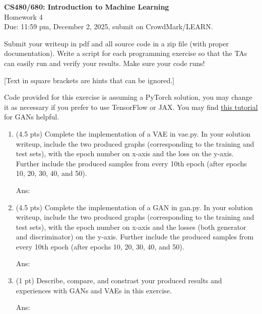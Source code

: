 \documentclass[10pt,letter,notitlepage]{article}
\newcommand{\ans}[1]{{\color{orange}\textsf{Ans}: #1}}
\newcounter{exercise}
\begin{document}
\begin{center}
\large{\textbf{CS480/680: Introduction to Machine Learning} \\ Homework 4\\ Due: 11:59 pm, December 2, 2025, submit on CrowdMark/LEARN.} \\


\end{center}

\begin{center}
Submit your writeup in pdf and all source code in a zip file (with proper documentation). Write a script for each programming exercise so that the TAs can easily run and verify your results. Make sure your code runs!

[Text in square brackets are hints that can be ignored.]
\end{center}


\begin{exercise}
  Code provided for this exercise is assuming a PyTorch solution, you may change it as necessary if you prefer to use TensorFlow or JAX.
  You may find \href{https://pytorch.org/tutorials/beginner/dcgan_faces_tutorial.html}{this tutorial} for GANs helpful. 
  \begin{enumerate}[label=\alph*]
    \item (4.5 pts) Complete the implementation of a VAE in vae.py. 
      In your solution writeup, include the two produced graphs (corresponding to the training and test sets), with the epoch number on x-axis and the loss on the y-axis.
      Further include the produced samples from every 10th epoch (after epochs 10, 20, 30, 40, and 50).

      \ans{} 
    \item (4.5 pts) Complete the implementation of a GAN in gan.py. 
      In your solution writeup, include the two produced graphs (corresponding to the training and test sets), with the epoch number on x-axis and the losses (both generator and discriminator) on the y-axis.
      Further include the produced samples from every 10th epoch (after epochs 10, 20, 30, 40, and 50).


      \ans{} 
    \item (1 pt) Describe, compare, and constrast your produced results and experiences with GANs and VAEs in this exercise.

      \ans{} 
  \end{enumerate}

\end{exercise}
\end{document}
